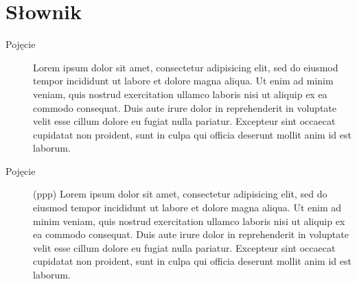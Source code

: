 \documentclass[10pt,a4paper,titlepage]{article} %
\begin{document}
\cleardoublepage

\section*{Słownik}
		
		\begin{description}
			\item[Pojęcie]
				Lorem ipsum dolor sit amet, consectetur adipisicing elit, sed do eiusmod tempor incididunt 
				ut labore et dolore magna aliqua. Ut enim ad 	minim veniam, quis nostrud exercitation 
				ullamco laboris nisi ut aliquip ex ea commodo consequat. Duis aute irure dolor in reprehenderit 
				in voluptate velit esse cillum dolore eu fugiat nulla pariatur. Excepteur sint occaecat 
				cupidatat non proident, sunt in culpa qui officia deserunt mollit anim id est laborum.				
			\item[Pojęcie] (ppp) 
				Lorem ipsum dolor sit amet, consectetur adipisicing elit, sed do eiusmod tempor incididunt 
				ut labore et dolore magna aliqua. Ut enim ad 	minim veniam, quis nostrud exercitation 
				ullamco laboris nisi ut aliquip ex ea commodo consequat. Duis aute irure dolor in reprehenderit 
				in voluptate velit esse cillum dolore eu fugiat nulla pariatur. Excepteur sint occaecat 
				cupidatat non proident, sunt in culpa qui officia deserunt mollit anim id est laborum.
		\end{description}
	
\end{document}
